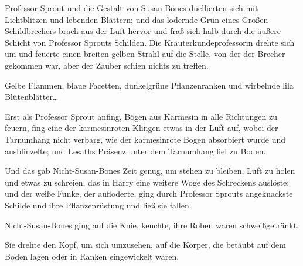 Professor Sprout und die Gestalt von Susan Bones duellierten sich mit Lichtblitzen und lebenden Blättern; und das lodernde Grün eines Großen Schildbrechers brach aus der Luft hervor und fraß sich halb durch die äußere Schicht von Professor Sprouts Schilden. Die Kräuterkundeprofessorin drehte sich um und feuerte einen breiten gelben Strahl auf die Stelle, von der der Brecher gekommen war, aber der Zauber schien nichts zu treffen.

Gelbe Flammen, blaue Facetten, dunkelgrüne Pflanzenranken und wirbelnde lila Blütenblätter…

Erst als Professor Sprout anfing, Bögen aus Karmesin in alle Richtungen zu feuern, fing eine der karmesinroten Klingen etwas in der Luft auf, wobei der Tarnumhang nicht verbarg, wie der karmesinrote Bogen absorbiert wurde und ausblinzelte; und Lesaths Präsenz unter dem Tarnumhang fiel zu Boden.

Und das gab Nicht-Susan-Bones Zeit genug, um stehen zu bleiben, Luft zu holen und etwas zu schreien, das in Harry eine weitere Woge des Schreckens auslöste; und der weiße Funke, der aufloderte, ging durch Professor Sprouts angeknackste Schilde und ihre Pflanzenrüstung und ließ sie fallen.

Nicht-Susan-Bones ging auf die Knie, keuchte, ihre Roben waren schweißgetränkt.

Sie drehte den Kopf, um sich umzusehen, auf die Körper, die betäubt auf dem Boden lagen oder in Ranken eingewickelt waren.

